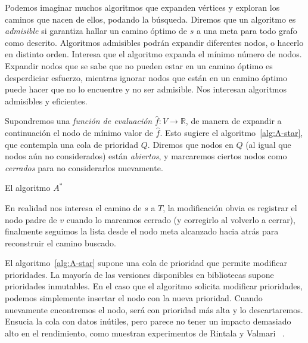   Podemos imaginar muchos algoritmos que expanden vértices
  y exploran los caminos que nacen de ellos,
  podando la búsqueda.
  Diremos que un algoritmo es \emph{admisible}
  si garantiza hallar un camino óptimo de \(s\) a una meta
  para todo grafo como descrito.
  Algoritmos admisibles podrán expandir diferentes nodos,
  o hacerlo en distinto orden.
  Interesa que el algoritmo expanda el mínimo número de nodos.
  Expandir nodos que se sabe que no pueden estar en un camino óptimo
  es desperdiciar esfuerzo,
  mientras ignorar nodos que están en un camino óptimo
  puede hacer que no lo encuentre y no ser admisible.
  Nos interesan algoritmos admisibles y eficientes.

  Supondremos una \emph{función de evaluación}
  \(\widehat{f} \colon V \to \mathbb{R}\),
  de manera de expandir a continuación
  el nodo de mínimo valor de \(\widehat{f}\).
  Esto sugiere el algoritmo~\ref{alg:A-star},
  que contempla una cola de prioridad \(Q\).
  Diremos que nodos en \(Q\)
  (al igual que nodos aún no considerados)
  están \emph{abiertos},
  y marcaremos ciertos nodos como \emph{cerrados}
  para no considerarlos nuevamente.
  \begin{algorithm}
    \DontPrintSemicolon\Indp

    \caption{El algoritmo \(A^*\)}
    \label{alg:A-star}
  \end{algorithm}
  En realidad nos interesa el camino de \(s\) a \(T\),
  la modificación obvia
  es registrar el nodo padre de \(v\) cuando lo marcamos cerrado
  (y corregirlo al volverlo a cerrar),
  finalmente seguimos la lista desde el nodo meta alcanzado hacia atrás
  para reconstruir el camino buscado.

  El algoritmo~\ref{alg:A-star}
  supone una cola de prioridad que permite modificar prioridades.
  La mayoría de las versiones disponibles en bibliotecas
  supone prioridades inmutables.
  En el caso que el algoritmo solicita modificar prioridades,
  podemos simplemente insertar el nodo con la nueva prioridad.
  Cuando nuevamente encontremos el nodo,
  será con prioridad más alta y lo descartaremos.
  Ensucia la cola con datos inútiles,
  pero parece no tener un impacto demasiado alto en el rendimiento,
  como muestran experimentos de Rintala y Valmari~%
   \cite{rintala15:_prio_queue_class}.

